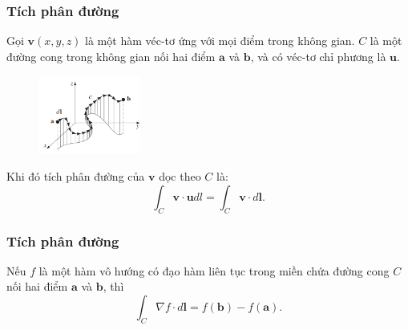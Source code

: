 \begin{frame}
\frametitle{Tích phân đường}
Gọi \(\mathbf v(x, y, z)\) là một hàm véc-tơ ứng với mọi điểm trong không gian. \(C\) là một đường cong trong không gian nối hai điểm \(\mathbf a\) và \(\mathbf b\), và có véc-tơ chỉ phương là \(\mathbf u\).
\begin{figure}
    \centering
    \includegraphics[width=0.3\textwidth]{Content/Figure/tichphanduong.png}
\end{figure}
Khi đó tích phân đường của \(\mathbf v\) dọc theo \(C\) là:
\begin{equation}
\int_C \mathbf v \cdot \mathbf u dl= \int_C \mathbf v \cdot d\mathbf l.
\end{equation}
\end{frame}

\begin{frame}
\frametitle{Tích phân đường}
\begin{tcolorbox}
[colback=blue!10!, colframe=blue!50!black, title=Định lý cơ bản của giải tích]
Nếu \(f\) là một hàm vô hướng có đạo hàm liên tục trong miền chứa đường cong \(C\) nối hai điểm \(\mathbf a\) và \(\mathbf b\), thì
\begin{equation}
\int_C \nabla f \cdot d\mathbf l = f(\mathbf b) - f(\mathbf a).
\end{equation}
\end{tcolorbox}
\end{frame}

